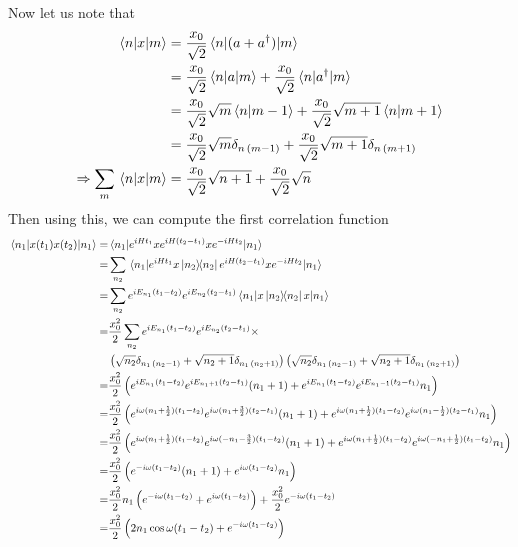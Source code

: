 \documentclass[a4paper,11pt]{article}
\begin{document}
Now let us note that
\begin{equation}
	\begin{aligned}
		\mel{n}{x}{m}&=\frac{x_0}{\sqrt{2}}\mel{n}{(a+a^\dagger)}{m}\\
		&=\frac{x_0}{\sqrt{2}}\mel{n}{a}{m}+\frac{x_0}{\sqrt{2}}\mel{n}{a^\dagger}{m}\\
		&=\frac{x_0}{\sqrt{2}}\sqrt{m}\braket{n}{m-1}+\frac{x_0}{\sqrt{2}}\sqrt{m+1}\braket{n}{m+1}\\
		&=\frac{x_0}{\sqrt{2}}\sqrt{m}\delta_{n\,(m-1)}+\frac{x_0}{\sqrt{2}}\sqrt{m+1}\delta_{n\,(m+1)}\\
		\Rightarrow\sum_m\mel{n}{x}{m}&=\frac{x_0}{\sqrt{2}}\sqrt{n+1}+\frac{x_0}{\sqrt{2}}\sqrt{n}
	\end{aligned}
\end{equation}
Then using this, we can compute the first correlation function
\begin{equation}
	\begin{aligned}
		\mel{n_1}{x(t_1)x(t_2)}{n_1}=&\mel{n_1}{e^{iHt_1}xe^{iH(t_2-t_1)}xe^{-iHt_2}}{n_1}\\
		=&\sum_{n_2}\mel{n_1}{e^{iHt_1}x\dyad{n_2}{n_2}e^{iH(t_2-t_1)}xe^{-iHt_2}}{n_1}
		\\
		=&\sum_{n_2}e^{iE_{n_1}(t_1-t_2)}e^{iE_{n_2}(t_2-t_1)}\mel{n_1}{x\dyad{n_2}{n_2}x}{n_1}
		\\
		=&\frac{x_0^2}{2}\sum_{n_2} e^{iE_{n_1}(t_1-t_2)}e^{iE_{n_2}(t_2-t_1)}\times \\
		&\left(\sqrt{n_2}\delta_{n_1\,(n_2-1)}+\sqrt{n_2+1}\delta_{n_1\,(n_2+1)}\right)\left(\sqrt{n_2}\delta_{n_1\,(n_2-1)}+\sqrt{n_2+1}\delta_{n_1 \,(n_2+1)}\right)
		\\
		=&\frac{x_0^2}{2}\left(e^{iE_{n_1}(t_1-t_2)}e^{iE_{n_1+1}(t_2-t_1)}(n_{1}+1)+e^{iE_{n_1}(t_1-t_2)}e^{iE_{n_1-1}(t_2-t_1)}n_1\right)
		\\
		=&\frac{x_0^2}{2}\left(e^{i\omega(n_1+\frac{1}{2})(t_1-t_2)}e^{i\omega(n_1+\frac{3}{2})(t_2-t_1)}(n_{1}+1)+e^{i\omega(n_1+\frac{1}{2})(t_1-t_2)}e^{i\omega(n_1-\frac{1}{2})(t_2-t_1)}n_1\right)
		\\
		=&\frac{x_0^2}{2}\left(e^{i\omega(n_1+\frac{1}{2})(t_1-t_2)}e^{i\omega(-n_1-\frac{3}{2})(t_1-t_2)}(n_{1}+1)+e^{i\omega(n_1+\frac{1}{2})(t_1-t_2)}e^{i\omega(-n_1+\frac{1}{2})(t_1-t_2)}n_1\right)
		\\
		=&\frac{x_0^2}{2}\left(e^{-i\omega(t_1-t_2)}(n_{1}+1)+e^{i\omega(t_1-t_2)}n_1\right)
	\\
	=&\frac{x_0^2}{2}n_{1}\left(e^{-i\omega(t_1-t_2)}+e^{i\omega(t_1-t_2)}\right)+\frac{x_0^2}{2}e^{-i\omega(t_1-t_2)}
		\\
	=&\frac{x_0^2}{2}\left(2n_1\cos{\omega (t_1-t_2)}+e^{-i\omega(t_1-t_2)}\right)
	\end{aligned}
\end{equation}
\end{document}
